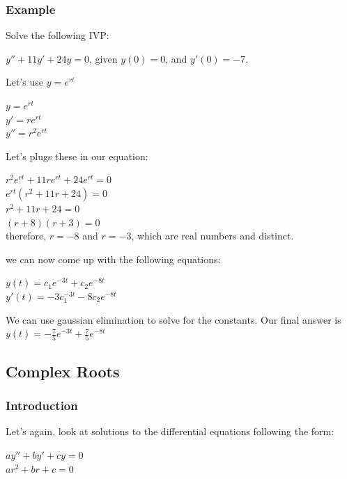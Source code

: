 \documentclass{article}
\begin{document}
\subsubsection{Example}

Solve the following IVP:

\begin{center}
    $y'' + 11y' + 24y = 0$, given $y(0) = 0$, and $y'(0) = -7$.
\end{center}

Let's use $y = e^{rt}$

\begin{center}
    $y = e^{rt}$ \\
    $y' = re^{rt}$ \\
    $y'' = r^2 e^{rt}$
\end{center}

Let's plugs these in our equation:

\begin{center}
    $r^2 e^{rt} + 11re^{rt} + 24e^{rt} = 0$ \\
    $e^{rt}(r^2 + 11r + 24) = 0$ \\
    $r^2 + 11r + 24 = 0$ \\
    $(r + 8)(r + 3) = 0$ \\
    therefore, $r = -8$ and $r = -3$, which are real numbers and distinct.
\end{center}

we can now come up with the following equations:

\begin{center}
    $y(t) = c_1 e^{-3t} + c_2 e^{-8t}$ \\
    $y'(t) = -3c_1^{-3t} - 8c_2 e^{-8t}$
\end{center}

We can use gaussian elimination to solve for the constants. Our final answer is $y(t) = -\frac{7}{5}e^{-3t} + \frac{7}{5} e^{-8t}$

\subsection{Complex Roots}
\subsubsection{Introduction}

Let's again, look at solutions to the differential equations following the form:

\begin{center}
    $ay'' + by' + cy = 0$ \\
    $ar^2 + br + c = 0$
\end{center}
\end{document}
